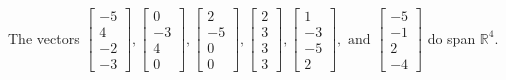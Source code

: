 \begin{exercise}
\begin{exerciseStatement}
  \end{exerciseStatement}
  \begin{exerciseAnswer}
   The vectors \(\left[\begin{array}{r}
-5 \\
4 \\
-2 \\
-3
\end{array}\right] , \left[\begin{array}{r}
0 \\
-3 \\
4 \\
0
\end{array}\right] , \left[\begin{array}{r}
2 \\
-5 \\
0 \\
0
\end{array}\right] , \left[\begin{array}{r}
2 \\
3 \\
3 \\
3
\end{array}\right] , \left[\begin{array}{r}
1 \\
-3 \\
-5 \\
2
\end{array}\right] , \text{ and } \left[\begin{array}{r}
-5 \\
-1 \\
2 \\
-4
\end{array}\right]\) 
  	 do  
	span \(\mathbb{R}^4\).
  


  \end{exerciseAnswer}
\end{exercise}